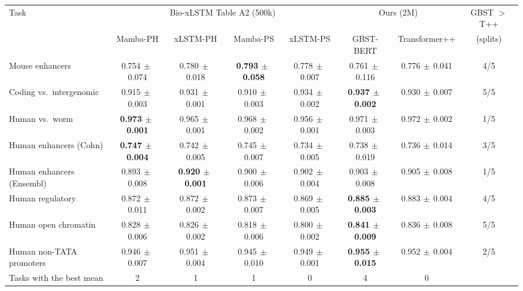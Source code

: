 \begin{tabular}{lccccccc}
\toprule
Task & \multicolumn{4}{c}{Bio-xLSTM Table A2 (500k)} & \multicolumn{2}{c}{Ours (2M)} & GBST $>$ T++ \\
\cmidrule(lr){2-5}\cmidrule(lr){6-7}
 & Mamba-PH & xLSTM-PH & Mamba-PS & xLSTM-PS & GBST-BERT & Transformer++ & (splits) \\
\midrule
Mouse enhancers & 0.754{\scriptsize$\,\pm\,$0.074} & 0.780{\scriptsize$\,\pm\,$0.018} & \textbf{0.793{\scriptsize$\,\pm\,$0.058}} & 0.778{\scriptsize$\,\pm\,$0.007} & 0.761{\scriptsize$\,\pm\,$0.116} & 0.776{\scriptsize$\,\pm\,$0.041} & 4/5 \\
Coding vs.\ intergenomic & 0.915{\scriptsize$\,\pm\,$0.003} & 0.931{\scriptsize$\,\pm\,$0.001} & 0.910{\scriptsize$\,\pm\,$0.003} & 0.934{\scriptsize$\,\pm\,$0.002} & \textbf{0.937{\scriptsize$\,\pm\,$0.002}} & 0.930{\scriptsize$\,\pm\,$0.007} & 5/5 \\
Human vs.\ worm & \textbf{0.973{\scriptsize$\,\pm\,$0.001}} & 0.965{\scriptsize$\,\pm\,$0.001} & 0.968{\scriptsize$\,\pm\,$0.002} & 0.956{\scriptsize$\,\pm\,$0.001} & 0.971{\scriptsize$\,\pm\,$0.003} & 0.972{\scriptsize$\,\pm\,$0.002} & 1/5 \\
Human enhancers (Cohn) & \textbf{0.747{\scriptsize$\,\pm\,$0.004}} & 0.742{\scriptsize$\,\pm\,$0.005} & 0.745{\scriptsize$\,\pm\,$0.007} & 0.734{\scriptsize$\,\pm\,$0.005} & 0.738{\scriptsize$\,\pm\,$0.019} & 0.736{\scriptsize$\,\pm\,$0.014} & 3/5 \\
Human enhancers (Ensembl) & 0.893{\scriptsize$\,\pm\,$0.008} & \textbf{0.920{\scriptsize$\,\pm\,$0.001}} & 0.900{\scriptsize$\,\pm\,$0.006} & 0.902{\scriptsize$\,\pm\,$0.004} & 0.903{\scriptsize$\,\pm\,$0.008} & 0.905{\scriptsize$\,\pm\,$0.008} & 1/5 \\
Human regulatory & 0.872{\scriptsize$\,\pm\,$0.011} & 0.872{\scriptsize$\,\pm\,$0.002} & 0.873{\scriptsize$\,\pm\,$0.007} & 0.869{\scriptsize$\,\pm\,$0.005} & \textbf{0.885{\scriptsize$\,\pm\,$0.003}} & 0.883{\scriptsize$\,\pm\,$0.004} & 4/5 \\
Human open chromatin & 0.828{\scriptsize$\,\pm\,$0.006} & 0.826{\scriptsize$\,\pm\,$0.002} & 0.818{\scriptsize$\,\pm\,$0.006} & 0.800{\scriptsize$\,\pm\,$0.002} & \textbf{0.841{\scriptsize$\,\pm\,$0.009}} & 0.836{\scriptsize$\,\pm\,$0.008} & 5/5 \\
Human non-TATA promoters & 0.946{\scriptsize$\,\pm\,$0.007} & 0.951{\scriptsize$\,\pm\,$0.004} & 0.945{\scriptsize$\,\pm\,$0.010} & 0.949{\scriptsize$\,\pm\,$0.001} & \textbf{0.955{\scriptsize$\,\pm\,$0.015}} & 0.952{\scriptsize$\,\pm\,$0.004} & 2/5 \\
\midrule
Tasks with the best mean & 2 & 1 & 1 & 0 & 4 & 0 & \\
\bottomrule
\end{tabular}
